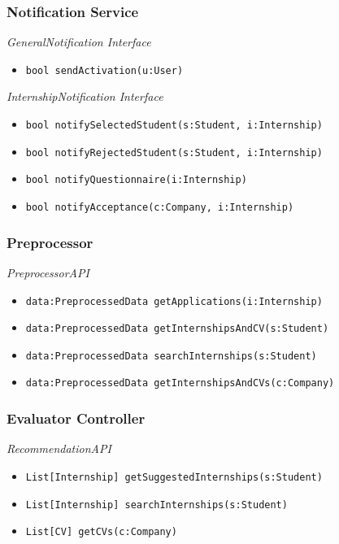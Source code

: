 \documentclass{article}
\begin{document}
\subsubsection{Notification Service}

\textit{GeneralNotification Interface}

\begin{itemize}
    \item \texttt{bool sendActivation(u:User)}
\end{itemize}

\begin{flushleft}
    \textit{InternshipNotification Interface}
\end{flushleft}

\begin{itemize}
    \item \texttt{bool notifySelectedStudent(s:Student, i:Internship)}
    \item \texttt{bool notifyRejectedStudent(s:Student, i:Internship)}
    \item \texttt{bool notifyQuestionnaire(i:Internship)}
    \item \texttt{bool notifyAcceptance(c:Company, i:Internship)}
\end{itemize}



\subsubsection{Preprocessor}
\textit{PreprocessorAPI}
\begin{itemize}
    \item \texttt{data:PreprocessedData getApplications(i:Internship)}
    \item \texttt{data:PreprocessedData getInternshipsAndCV(s:Student)}
    \item \texttt{data:PreprocessedData searchInternships(s:Student)}
    \item \texttt{data:PreprocessedData getInternshipsAndCVs(c:Company)}

\end{itemize}

\subsubsection{Evaluator Controller}
\textit{RecommendationAPI}
\begin{itemize}
    \item \texttt{List[Internship] getSuggestedInternships(s:Student)}
    \item \texttt{List[Internship] searchInternships(s:Student)}
    \item \texttt{List[CV] getCVs(c:Company)}
\end{itemize}
\end{document}
